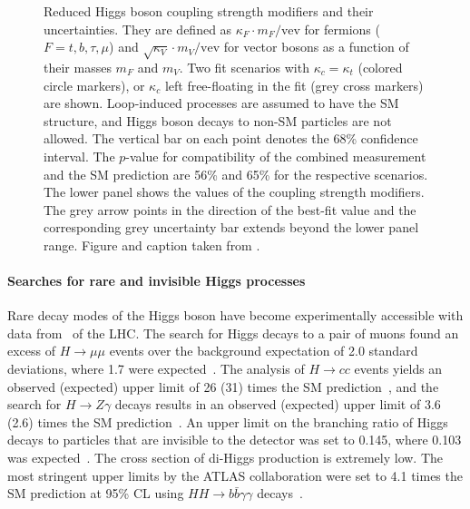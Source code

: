 \begin{figure}
  \caption{
    Reduced Higgs boson coupling strength modifiers and their uncertainties. They are defined as $\kappa_F \cdot m_F / \text{vev}$ for fermions
($F=t,b,\tau,\mu$) and $\sqrt{\kappa_V}\cdot m_V/\text{vev}$ for vector bosons as a
function of their masses $m_F$ and $m_V$. Two fit scenarios with $\kappa_c =
\kappa_t$ (colored circle markers), or $\kappa_c$ left free-floating in the fit (grey
cross markers) are shown. Loop-induced processes are assumed to have the SM structure, and Higgs boson decays to non-SM particles are not allowed. The vertical bar on each point denotes the 68\% confidence interval. The $p$-value for compatibility of the combined measurement and the SM prediction are 56\% and 65\% for the respective scenarios. The lower panel shows the values of the coupling strength modifiers. The grey arrow points in the direction of the best-fit value and the corresponding grey uncertainty bar extends beyond the lower panel range. Figure and caption taken from .}
  \label{fig:h-couplings}
\end{figure}

\paragraph{Searches for rare and invisible Higgs processes}
Rare decay modes of the Higgs boson have become experimentally accessible with data from \RunTwo\ of the LHC. 
The search for Higgs decays to a pair of muons found an excess of $H \to \mu\mu$ events over the background expectation of 2.0 standard deviations, where 1.7 were expected~\cite{HIGG-2019-14}.
The analysis of $H \to cc$ events yields an observed (expected) upper limit of 26 (31) times the SM prediction~\cite{ATLAS-CONF-2021-021}, and the search for $H \to Z\gamma$ decays results in an observed (expected) upper limit of 3.6 (2.6) times the SM prediction~\cite{HIGG-2018-42}.
An upper limit on the branching ratio of Higgs decays to particles that are invisible to the detector was set to 0.145, where 0.103 was expected~\cite{ATLASInvisible1}.
The cross section of di-Higgs production is extremely low. The most stringent upper limits by the ATLAS collaboration were set to 4.1 times the SM prediction at 95\% CL using $HH \to b\bar{b}\gamma\gamma$ decays~\cite{ATLAS-CONF-2021-016}.


